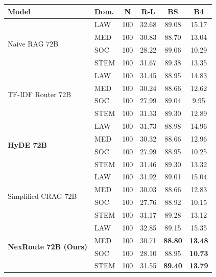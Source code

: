 \documentclass[a4paper,fleql,doubleblind]{cas-sc}
\begin{document}
\vspace{6pt plus 4pt minus 3pt}

\begin{center}
\begingroup
\small
\renewcommand{\arraystretch}{0.9}
\label{tab:domain_breakdown_72b}
\begin{tabular}{llcccc}
\toprule
\textbf{Model} & \textbf{Dom.} & \textbf{N} & \textbf{R-L} & \textbf{BS} & \textbf{B4} \\
\midrule
\multirow{4}{*}{Naive RAG 72B}
  & LAW  & 100 & 32.68 & 89.08 & 15.17 \\
  & MED  & 100 & 30.83 & 88.70 & 13.04 \\
  & SOC  & 100 & 28.22 & 89.06 & 10.29 \\
  & STEM & 100 & 31.67 & 89.38 & 13.35 \\
\midrule
\multirow{4}{*}{TF-IDF Router 72B}
  & LAW  & 100 & 31.45 & 88.95 & 14.83 \\
  & MED  & 100 & 30.24 & 88.66 & 12.62 \\
  & SOC  & 100 & 27.99 & 89.04 &  9.95 \\
  & STEM & 100 & 31.33 & 89.30 & 12.89 \\
\midrule
\multirow{4}{*}{\textbf{HyDE 72B}}
  & LAW  & 100 & 31.73 & 88.98 & 14.96 \\
  & MED  & 100 & 30.32 & 88.66 & 12.96 \\
  & SOC  & 100 & 27.99 & 88.95 & 10.25 \\
  & STEM & 100 & 31.46 & 89.30 & 13.32 \\
\midrule
\multirow{4}{*}{Simplified CRAG 72B}
  & LAW  & 100 & 31.92 & 89.01 & 15.04 \\
  & MED  & 100 & 30.03 & 88.66 & 12.83 \\
  & SOC  & 100 & 27.76 & 88.92 & 10.15 \\
  & STEM & 100 & 31.17 & 89.28 & 13.12 \\
\midrule
\multirow{4}{*}{\textbf{NexRoute 72B (Ours)}}
  & LAW  & 100 & 32.85 & 89.15 & 15.35 \\
  & MED  & 100 & 30.71 & \textbf{88.80} & \textbf{13.48} \\
  & SOC  & 100 & 28.10 & 88.95 & \textbf{10.73} \\
  & STEM & 100 & 31.55 & \textbf{89.40} & \textbf{13.79} \\
\bottomrule
\end{tabular}
\endgroup
\end{center}
\vspace{6pt plus 4pt minus 3pt}
\end{document}
